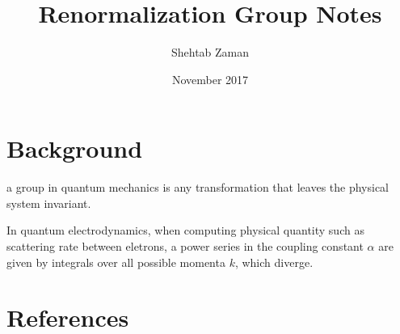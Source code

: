 \documentclass{article}
\title{Renormalization Group Notes}
\author{Shehtab Zaman }
\date{November 2017}
\begin{document}
\maketitle

\section{Background}

a group in quantum mechanics is any transformation
that leaves the physical system invariant.

In quantum electrodynamics, when computing physical quantity such
as scattering rate between eletrons, a power series in the coupling constant $\alpha $
are given by integrals over all possible momenta $ k$, which diverge.

\section{References}
\end{document}
